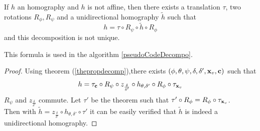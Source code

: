 \begin{corollaire} If $h$ an homography and $h$ is not affine, then there exists a translation $\tau$, two rotations $R_\phi ,R_\psi$ and a unidirectional homography $\tilde{h}$ such that
\begin{equation}
h=\tau \circ R_\psi \circ \tilde{h} \circ R_\phi
\label{formule_decomposition_effective}
\end{equation}
and this decomposition is not unique.
\end{corollaire}

		This formula is used in the algorithm \ref{pseudoCodeDecompo}.
		
		\begin{proof}
	 Using theorem (\ref{thepropdecomp}),there exists $(\phi,\theta,\psi,\delta,\delta',\mathbf{x}_v,\mathbf{c})$ such that 
	 \begin{equation*}
	 h = \tau_{\mathbf{c}} \circ R_{\psi} \circ z_{\frac{\delta}{\delta'}} \circ h_{\theta,\delta'} \circ R_{\phi} \circ \tau_{\mathbf{x}_v}
	 \end{equation*}
	 $R_\psi$ and $z_{\frac{\delta}{\delta'}}$ commute. Let $\tau'$ be the theorem such that $\tau' \circ R_\phi =  R_\phi \circ \tau_{\mathbf{x}_v}$.\\
	 Then with $\tilde{h} = z_{\frac{\delta}{\delta'}} \circ 
	 h_{\theta,\delta'} \circ \tau'$ it can be easily verified that $\tilde{h}$ is indeed a unidirectional homography.
	 \end{proof}
	\label{ref_schema_decomp_cool}
